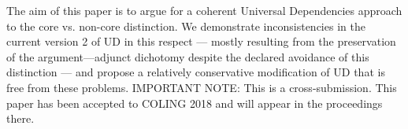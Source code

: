 The aim of this paper is to argue for a coherent Universal Dependencies approach to the core vs. non-core distinction. We demonstrate inconsistencies in the current version 2 of UD in this respect --- mostly resulting from the preservation of the argument---adjunct dichotomy despite the declared avoidance of this distinction --- and propose a relatively conservative modification of UD that is free from these problems. IMPORTANT NOTE: This is a cross-submission. This paper has been accepted to COLING 2018 and will appear in the proceedings there.
